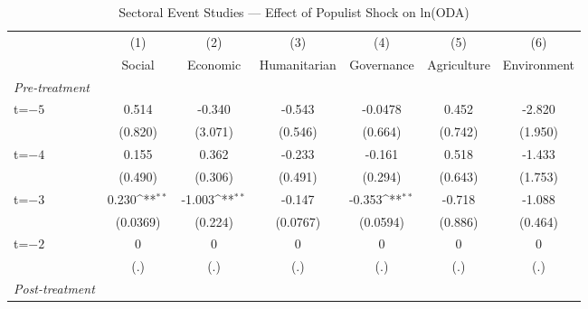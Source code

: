 \begin{table}[htbp]\centering
\def\sym#1{\ifmmode^{#1}\else\(^{#1}\)\fi}
\caption{Sectoral Event Studies --- Effect of Populist Shock on ln(ODA)}
\begin{tabular}{l*{6}{c}}
\toprule
            &\multicolumn{1}{c}{(1)}&\multicolumn{1}{c}{(2)}&\multicolumn{1}{c}{(3)}&\multicolumn{1}{c}{(4)}&\multicolumn{1}{c}{(5)}&\multicolumn{1}{c}{(6)}\\
            &\multicolumn{1}{c}{Social}&\multicolumn{1}{c}{Economic}&\multicolumn{1}{c}{Humanitarian}&\multicolumn{1}{c}{Governance}&\multicolumn{1}{c}{Agriculture}&\multicolumn{1}{c}{Environment}\\
\midrule
\textit{Pre-treatment}&                     &                     &                     &                     &                     &                     \\
\addlinespace
t=$-5$      &       0.514         &      -0.340         &      -0.543         &     -0.0478         &       0.452         &      -2.820         \\
            &     (0.820)         &     (3.071)         &     (0.546)         &     (0.664)         &     (0.742)         &     (1.950)         \\
\addlinespace
t=$-4$      &       0.155         &       0.362         &      -0.233         &      -0.161         &       0.518         &      -1.433         \\
            &     (0.490)         &     (0.306)         &     (0.491)         &     (0.294)         &     (0.643)         &     (1.753)         \\
\addlinespace
t=$-3$      &       0.230\sym{**} &      -1.003\sym{**} &      -0.147         &      -0.353\sym{**} &      -0.718         &      -1.088         \\
            &    (0.0369)         &     (0.224)         &    (0.0767)         &    (0.0594)         &     (0.886)         &     (0.464)         \\
\addlinespace
t=$-2$      &           0         &           0         &           0         &           0         &           0         &           0         \\
            &         (.)         &         (.)         &         (.)         &         (.)         &         (.)         &         (.)         \\
\addlinespace
\textit{Post-treatment}&                     &                     &                     &                     &                     &                     \\

\end{tabular}
\end{table}
